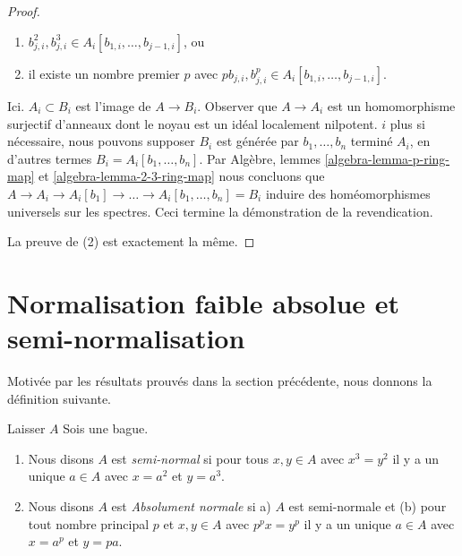 \begin{proof}
\begin{enumerate}
\item  $b_{j, i}^2, b_{j, i}^3 \in A_i[b_{1, i}, \ldots, b_{j - 1, i}]$, ou
\item il existe un nombre premier $p$ avec
$pb_{j, i}, b_{j, i}^p \in A_i[b_{1, i}, \ldots, b_{j - 1, i}]$.

\end{enumerate}

Ici. $A_i \subset B_i$ est l'image de $A \to B_i$. Observer que $A \to A_i$
est un homomorphisme surjectif d'anneaux dont le noyau est un idéal localement nilpotent. $i$ plus si nécessaire, nous pouvons supposer $B_i$
est générée par $b_1, \ldots, b_n$ terminé $A_i$, en d'autres termes
$B_i = A_i[b_1, \ldots, b_n]$. Par Algèbre, lemmes \ref{algebra-lemma-p-ring-map} et
\ref{algebra-lemma-2-3-ring-map} nous concluons que
$A \to A_i \to A_i[b_1] \to \ldots \to A_i[b_1, \ldots, b_n] = B_i$
induire des homéomorphismes universels sur les spectres. Ceci termine la démonstration de la revendication.

\medskip\noindent

La preuve de (2) est exactement la même.

\end{proof}







\section{Normalisation faible absolue et semi-normalisation}
\label{section-seminormalization}

\noindent
Motivée par les résultats prouvés dans la section précédente, nous donnons la définition suivante.

\begin{definition}

\label{definition-seminormal-ring}

Laisser $A$ Sois une bague.

\begin{enumerate}

\item Nous disons $A$ est {\it semi-normal} si pour tous $x, y \in A$
avec $x^3 = y^2$ il y a un unique $a \in A$ avec
$x = a^2$ et $y = a^3$.
\item Nous disons $A$ est {\it Absolument normale} si a) $A$ est semi-normale et (b) pour tout nombre principal $p$ et $x, y \in A$ avec $p^px = y^p$
il y a un unique $a \in A$ avec $x = a^p$ et $y = pa$.

\end{enumerate}

\end{definition}

